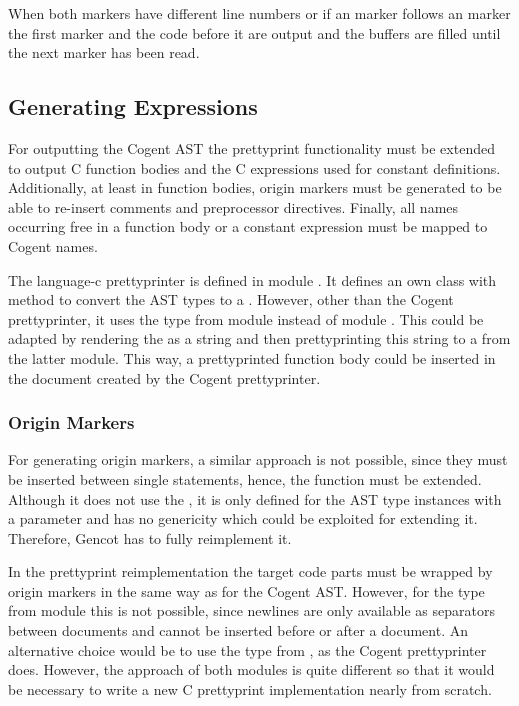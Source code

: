 When both markers have different line numbers or if an  marker follows an 
marker the first marker and the code before it are output and the buffers are filled until the next marker
has been read.

\subsection{Generating Expressions}
\label{impl-ccode-expr}

For outputting the Cogent AST the prettyprint functionality must be extended to 
output C function bodies and the C expressions used for constant definitions. Additionally, at least in function bodies,
origin markers must be generated to be able to re-insert comments and preprocessor directives. Finally, all names
occurring free in a function body or a constant expression must be mapped to Cogent names.

The language-c prettyprinter is defined in module . It defines an own class  with 
method  to convert the AST types to a . However, other than the Cogent prettyprinter, it uses 
the type  from module  instead of module .
This could be adapted by rendering the  as a string and then prettyprinting this string to a 
from the latter module. This way, a prettyprinted function body could be inserted in the document created by the
Cogent prettyprinter.

\subsubsection{Origin Markers}

For generating origin markers, a similar approach is not possible, since they must be inserted between single statements,
hence, the function  must be extended. Although it does not use the , it is only defined for
the AST type instances with a  parameter and has no genericity which could be exploited for extending it.
Therefore, Gencot has to fully reimplement it. 

In the prettyprint reimplementation the target code parts must be wrapped by origin markers
in the same way as for the Cogent AST. However, for the type  from module  
this is not possible, since newlines are only
available as separators between documents and cannot be inserted before or after a document. An alternative choice
would be to use the type  from , as the Cogent prettyprinter does.
However, the approach of both modules is quite different so that it would be necessary to write a new C 
prettyprint implementation nearly from scratch. 

